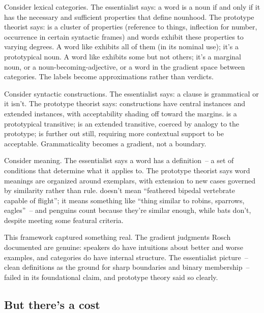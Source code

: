Consider lexical categories. The essentialist says: a word is a noun if and only if it has the necessary and sufficient properties that define nounhood. The prototype theorist says:  is a cluster of properties (reference to things, inflection for number, occurrence in certain syntactic frames) and words exhibit these properties to varying degrees. A word like  exhibits all of them (in its nominal use); it's a prototypical noun. A word like  exhibits some but not others; it's a marginal noun, or a noun-becoming-adjective, or a word in the gradient space between categories. The labels become approximations rather than verdicts.

Consider syntactic constructions. The essentialist says: a clause is grammatical or it isn't. The prototype theorist says: constructions have central instances and extended instances, with acceptability shading off toward the margins.  is a prototypical transitive;  is an extended transitive, coerced by analogy to the prototype;  is further out still, requiring more contextual support to be acceptable. Grammaticality becomes a gradient, not a boundary.

Consider meaning. The essentialist says a word has a definition~-- a set of conditions that determine what it applies to. The prototype theorist says word meanings are organized around exemplars, with extension to new cases governed by similarity rather than rule.  doesn't mean \enquote{feathered bipedal vertebrate capable of flight}; it means something like \enquote{thing similar to robins, sparrows, eagles}~-- and penguins count because they're similar enough, while bats don't, despite meeting some featural criteria.

This framework captured something real. The gradient judgments Rosch documented are genuine: speakers do have intuitions about better and worse examples, and categories do have internal structure. The essentialist picture~-- clean definitions as the ground for sharp boundaries and binary membership~-- failed in its foundational claim, and prototype theory said so clearly.

\subsection{But there's a cost}
\label{sec:1:cost}

